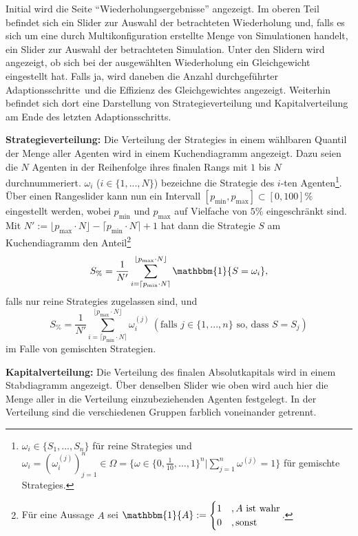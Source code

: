 \documentclass[parskip=full,11pt]{scrartcl}
\def\adapt{Adaptionsschritt}
\def\adapts{Adaptionsschritte}
\begin{document}
Initial wird die Seite \enquote{Wiederholungsergebnisse} angezeigt. Im oberen Teil befindet sich ein Slider zur Auswahl der betrachteten Wiederholung und, falls es sich um eine durch Multikonfiguration erstellte Menge von Simulationen handelt, ein Slider zur Auswahl der betrachteten Simulation. Unter den Slidern wird angezeigt, ob sich bei der ausgewählten Wiederholung ein \Gls{Gleichgewicht} eingestellt hat. Falls ja, wird daneben die Anzahl durchgeführter \adapts\ und die \Gls{Effizienz} des \Gls{Gleichgewicht}es angezeigt. Weiterhin befindet sich dort eine Darstellung von Strategieverteilung und Kapitalverteilung am Ende des letzten \adapt s.

\textbf{Strategieverteilung:}
Die Verteilung der \Glspl{Strategie} in einem wählbaren Quantil der Menge aller Agenten wird in einem Kuchendiagramm angezeigt. Dazu seien die \(N\) Agenten in der Reihenfolge ihres finalen Rangs mit \(1\) bis \(N\) durchnummeriert. \(\omega_i\) (\(i \in \{1,...,N\}\)) bezeichne die \Gls{Strategie} des \(i\)-ten Agenten\footnote{\(\omega_i \in \{S_1,...,S_n\}\) für reine \Glspl{Strategie} und \(\omega_i = (\omega_i^{(j)})_{j=1}^n \in \Omega = \{\omega \in \{0,\frac{1}{10},...,1\}^n | \sum_{j=1}^n \omega^{(j)} = 1\}\) für \glspl{gemischte Strategie}.}. Über einen Rangeslider kann nun ein Intervall \([p_\text{min},p_\text{max}] \subset [0,100]\%\) eingestellt werden, wobei \(p_\text{min}\) und \(p_\text{max}\) auf Vielfache von \(5\%\) eingeschränkt sind. Mit \(N' := \lfloor p_\text{max} \cdot N \rfloor - \lceil p_\text{min} \cdot N \rceil + 1\) hat dann die \Gls{Strategie} \(S\) am Kuchendiagramm den Anteil\footnote{Für eine Aussage \(A\) sei \(\mathbbm{1}\{A\} := \begin{cases} 1 & , A \text{ ist wahr} \\ 0 &, \text{sonst}\end{cases}\).}
\[
S_\% = \frac{1}{N'} \sum_{i=\lceil p_\text{min} \cdot N \rceil}^{\lfloor p_\text{max} \cdot N \rfloor} \mathbbm{1}\{S = \omega_i\},
\]
falls nur reine \Glspl{Strategie} zugelassen sind, und
\[
S_\% = \frac{1}{N'} \sum_{i=\lceil p_\text{min} \cdot N \rceil}^{\lfloor p_\text{max} \cdot N \rfloor} \omega_i^{(j)}  \ (\text{falls } j \in \{1,...,n\} \text{ so, dass } S = S_j)
\]
im Falle von gemischten Strategien.

\textbf{Kapitalverteilung:}
Die Verteilung des finalen Absolutkapitals wird in einem Stabdiagramm angezeigt. Über denselben Slider wie oben wird auch hier die Menge aller in die Verteilung einzubeziehenden Agenten festgelegt. In der Verteilung sind die verschiedenen Gruppen farblich voneinander getrennt.
\end{document}
